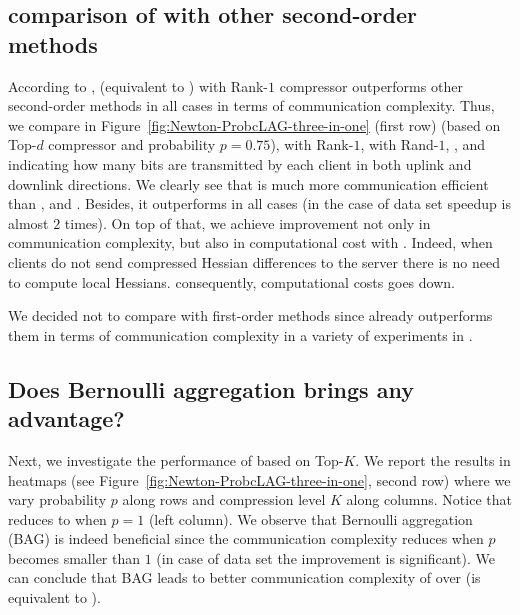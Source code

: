 \documentclass[11pt]{article}
\begin{document}
	\subsection{comparison of  with other second-order methods}
	According to \citep{FedNL2021},  (equivalent to ) with Rank-$1$ compressor outperforms other second-order methods in all cases in terms of communication complexity. Thus, we compare in Figure~\ref{fig:Newton-ProbcLAG-three-in-one} (first row)  (based on Top-$d$ compressor and probability $p=0.75$),  with Rank-$1$,  with Rand-$1$, , and  indicating how many bits are transmitted by each client in both uplink and downlink directions. We clearly see that  is much more communication efficient than ,  and . Besides, it outperforms  in all cases (in the case of  data set speedup is almost $2$ times). On top of that, we achieve improvement not only in communication complexity, but also in computational cost with . Indeed, when clients do not send compressed Hessian differences to the server there is no need to compute local Hessians. consequently, computational costs goes down.
	
	We decided not to compare  with first-order methods since  already outperforms them in terms of communication complexity in a variety of experiments in \citep{FedNL2021}.
	
	
	\subsection{Does Bernoulli aggregation brings any advantage?}
	Next, we investigate the performance of  based on Top-$K$. We report the results in 
	heatmaps (see Figure~\ref{fig:Newton-ProbcLAG-three-in-one}, second row) where we vary probability $p$ along rows and compression level $K$ along columns. Notice that  reduces to  when $p=1$ (left column). We observe that Bernoulli aggregation (BAG) is indeed beneficial since the communication complexity reduces when $p$ becomes smaller than $1$ (in case of  data set the improvement is significant). We can conclude that BAG leads to better communication complexity of  over  (is equivalent to ).
	
\end{document}

